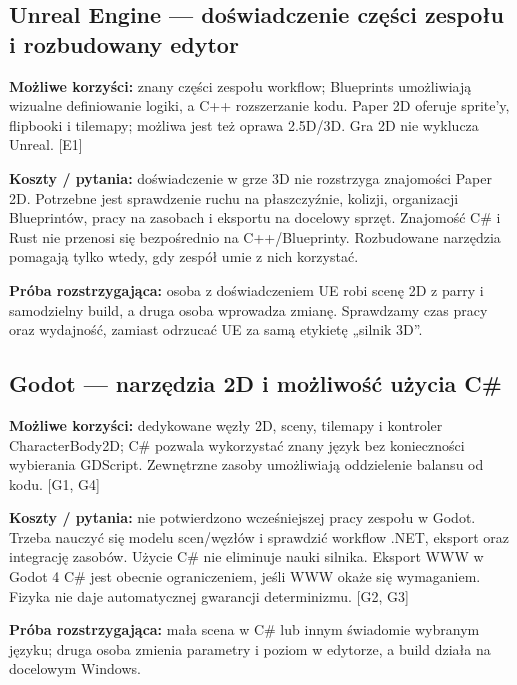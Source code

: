 \documentclass[10pt,a4paper]{article}
\begin{document}
\subsection*{Unreal Engine — doświadczenie części zespołu i rozbudowany edytor}


\textbf{Możliwe korzyści:} znany części zespołu workflow; Blueprints umożliwiają wizualne definiowanie logiki, a C++ rozszerzanie kodu. Paper 2D oferuje sprite'y, flipbooki i tilemapy; możliwa jest też oprawa 2.5D/3D. Gra 2D nie wyklucza Unreal. [E1]



\textbf{Koszty / pytania:} doświadczenie w grze 3D nie rozstrzyga znajomości Paper 2D. Potrzebne jest sprawdzenie ruchu na płaszczyźnie, kolizji, organizacji Blueprintów, pracy na zasobach i eksportu na docelowy sprzęt. Znajomość C\# i Rust nie przenosi się bezpośrednio na C++/Blueprinty. Rozbudowane narzędzia pomagają tylko wtedy, gdy zespół umie z nich korzystać.



\textbf{Próba rozstrzygająca:} osoba z doświadczeniem UE robi scenę 2D z parry i samodzielny build, a druga osoba wprowadza zmianę. Sprawdzamy czas pracy oraz wydajność, zamiast odrzucać UE za samą etykietę „silnik 3D”.



\subsection*{Godot — narzędzia 2D i możliwość użycia C\#}


\textbf{Możliwe korzyści:} dedykowane węzły 2D, sceny, tilemapy i kontroler CharacterBody2D; C\# pozwala wykorzystać znany język bez konieczności wybierania GDScript. Zewnętrzne zasoby umożliwiają oddzielenie balansu od kodu. [G1, G4]



\textbf{Koszty / pytania:} nie potwierdzono wcześniejszej pracy zespołu w Godot. Trzeba nauczyć się modelu scen/węzłów i sprawdzić workflow .NET, eksport oraz integrację zasobów. Użycie C\# nie eliminuje nauki silnika. Eksport WWW w Godot 4 C\# jest obecnie ograniczeniem, jeśli WWW okaże się wymaganiem. Fizyka nie daje automatycznej gwarancji determinizmu. [G2, G3]



\textbf{Próba rozstrzygająca:} mała scena w C\# lub innym świadomie wybranym języku; druga osoba zmienia parametry i poziom w edytorze, a build działa na docelowym Windows.
\end{document}
